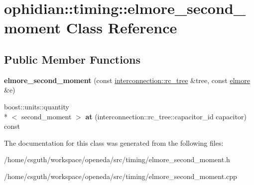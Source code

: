 \hypertarget{classophidian_1_1timing_1_1elmore__second__moment}{\section{ophidian\-:\-:timing\-:\-:elmore\-\_\-second\-\_\-moment Class Reference}
\label{classophidian_1_1timing_1_1elmore__second__moment}
}
\subsection*{Public Member Functions}
\begin{DoxyCompactItemize}
\item 
\hypertarget{classophidian_1_1timing_1_1elmore__second__moment_aef9b6f06c6bc25c6d6849a5adbf3814f}{{\bfseries elmore\-\_\-second\-\_\-moment} (const \hyperlink{classophidian_1_1interconnection_1_1rc__tree}{interconnection\-::rc\-\_\-tree} \&tree, const \hyperlink{classophidian_1_1timing_1_1elmore}{elmore} \&e)}\label{classophidian_1_1timing_1_1elmore__second__moment_aef9b6f06c6bc25c6d6849a5adbf3814f}

\item 
\hypertarget{classophidian_1_1timing_1_1elmore__second__moment_a5a6f1e71836dde5f1be8f9d2102fdfcf}{boost\-::units\-::quantity\\*
$<$ second\-\_\-moment $>$ {\bfseries at} (interconnection\-::rc\-\_\-tree\-::capacitor\-\_\-id capacitor) const }\label{classophidian_1_1timing_1_1elmore__second__moment_a5a6f1e71836dde5f1be8f9d2102fdfcf}

\end{DoxyCompactItemize}


The documentation for this class was generated from the following files\-:\begin{DoxyCompactItemize}
\item 
/home/csguth/workspace/openeda/src/timing/elmore\-\_\-second\-\_\-moment.\-h\item 
/home/csguth/workspace/openeda/src/timing/elmore\-\_\-second\-\_\-moment.\-cpp\end{DoxyCompactItemize}
